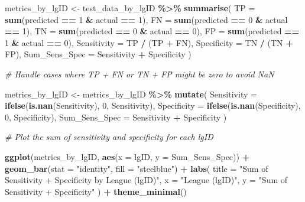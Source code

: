 \documentclass[
]{article}
\newenvironment{Shaded}{\begin{snugshade}}{\end{snugshade}}
\newcommand{\AttributeTok}[1]{\textcolor[rgb]{0.13,0.29,0.53}{#1}}
\newcommand{\CommentTok}[1]{\textcolor[rgb]{0.56,0.35,0.01}{\textit{#1}}}
\newcommand{\DecValTok}[1]{\textcolor[rgb]{0.00,0.00,0.81}{#1}}
\newcommand{\FunctionTok}[1]{\textcolor[rgb]{0.13,0.29,0.53}{\textbf{#1}}}
\newcommand{\NormalTok}[1]{#1}
\newcommand{\OtherTok}[1]{\textcolor[rgb]{0.56,0.35,0.01}{#1}}
\newcommand{\SpecialCharTok}[1]{\textcolor[rgb]{0.81,0.36,0.00}{\textbf{#1}}}
\newcommand{\StringTok}[1]{\textcolor[rgb]{0.31,0.60,0.02}{#1}}
\begin{document}
\begin{Shaded}
\begin{Highlighting}[]
\NormalTok{metrics\_by\_lgID }\OtherTok{\textless{}{-}}\NormalTok{ test\_data\_by\_lgID }\SpecialCharTok{\%\textgreater{}\%}
  \FunctionTok{summarise}\NormalTok{(}
    \AttributeTok{TP =} \FunctionTok{sum}\NormalTok{(predicted }\SpecialCharTok{==} \DecValTok{1} \SpecialCharTok{\&}\NormalTok{ actual }\SpecialCharTok{==} \DecValTok{1}\NormalTok{),}
    \AttributeTok{FN =} \FunctionTok{sum}\NormalTok{(predicted }\SpecialCharTok{==} \DecValTok{0} \SpecialCharTok{\&}\NormalTok{ actual }\SpecialCharTok{==} \DecValTok{1}\NormalTok{),}
    \AttributeTok{TN =} \FunctionTok{sum}\NormalTok{(predicted }\SpecialCharTok{==} \DecValTok{0} \SpecialCharTok{\&}\NormalTok{ actual }\SpecialCharTok{==} \DecValTok{0}\NormalTok{),}
    \AttributeTok{FP =} \FunctionTok{sum}\NormalTok{(predicted }\SpecialCharTok{==} \DecValTok{1} \SpecialCharTok{\&}\NormalTok{ actual }\SpecialCharTok{==} \DecValTok{0}\NormalTok{),}
    \AttributeTok{Sensitivity =}\NormalTok{ TP }\SpecialCharTok{/}\NormalTok{ (TP }\SpecialCharTok{+}\NormalTok{ FN),}
    \AttributeTok{Specificity =}\NormalTok{ TN }\SpecialCharTok{/}\NormalTok{ (TN }\SpecialCharTok{+}\NormalTok{ FP),}
    \AttributeTok{Sum\_Sens\_Spec =}\NormalTok{ Sensitivity }\SpecialCharTok{+}\NormalTok{ Specificity}
\NormalTok{  )}

\CommentTok{\# Handle cases where TP + FN or TN + FP might be zero to avoid NaN}

\NormalTok{metrics\_by\_lgID }\OtherTok{\textless{}{-}}\NormalTok{ metrics\_by\_lgID }\SpecialCharTok{\%\textgreater{}\%}
  \FunctionTok{mutate}\NormalTok{(}
    \AttributeTok{Sensitivity =} \FunctionTok{ifelse}\NormalTok{(}\FunctionTok{is.nan}\NormalTok{(Sensitivity), }\DecValTok{0}\NormalTok{, Sensitivity),}
    \AttributeTok{Specificity =} \FunctionTok{ifelse}\NormalTok{(}\FunctionTok{is.nan}\NormalTok{(Specificity), }\DecValTok{0}\NormalTok{, Specificity),}
    \AttributeTok{Sum\_Sens\_Spec =}\NormalTok{ Sensitivity }\SpecialCharTok{+}\NormalTok{ Specificity}
\NormalTok{  )}

\CommentTok{\# Plot the sum of sensitivity and specificity for each lgID}

\FunctionTok{ggplot}\NormalTok{(metrics\_by\_lgID, }\FunctionTok{aes}\NormalTok{(}\AttributeTok{x =}\NormalTok{ lgID, }\AttributeTok{y =}\NormalTok{ Sum\_Sens\_Spec)) }\SpecialCharTok{+}
  \FunctionTok{geom\_bar}\NormalTok{(}\AttributeTok{stat =} \StringTok{"identity"}\NormalTok{, }\AttributeTok{fill =} \StringTok{"steelblue"}\NormalTok{) }\SpecialCharTok{+}
  \FunctionTok{labs}\NormalTok{(}
    \AttributeTok{title =} \StringTok{"Sum of Sensitivity + Specificity by League (lgID)"}\NormalTok{,}
    \AttributeTok{x =} \StringTok{"League (lgID)"}\NormalTok{,}
    \AttributeTok{y =} \StringTok{"Sum of Sensitivity + Specificity"}
\NormalTok{  ) }\SpecialCharTok{+}
  \FunctionTok{theme\_minimal}\NormalTok{()}
\end{Highlighting}
\end{Shaded}
\end{document}
